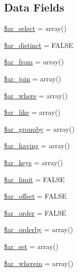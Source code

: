 \subsection*{Data Fields}
\begin{DoxyCompactItemize}
\item 
\hyperlink{class_c_i___d_b__active__record_a6e20fdd21772a1afe552931b7e8226b7}{\$ar\-\_\-select} = array()
\item 
\hyperlink{class_c_i___d_b__active__record_a095d86bc9e6d06232acfa6d43a245fc0}{\$ar\-\_\-distinct} = F\-A\-L\-S\-E
\item 
\hyperlink{class_c_i___d_b__active__record_a862adab461db1d5e818cea446648220c}{\$ar\-\_\-from} = array()
\item 
\hyperlink{class_c_i___d_b__active__record_a7586606381cc112cad3f31aabbc31ea6}{\$ar\-\_\-join} = array()
\item 
\hyperlink{class_c_i___d_b__active__record_acc294995d7d46cfa1c5e4377b1a691ec}{\$ar\-\_\-where} = array()
\item 
\hyperlink{class_c_i___d_b__active__record_a932080b6d718eb255adee55d0a05f815}{\$ar\-\_\-like} = array()
\item 
\hyperlink{class_c_i___d_b__active__record_a708d484566c200d28d8e3139cc6a8a6c}{\$ar\-\_\-groupby} = array()
\item 
\hyperlink{class_c_i___d_b__active__record_a7d7dbdaa94e66d6e18088da8c614644d}{\$ar\-\_\-having} = array()
\item 
\hyperlink{class_c_i___d_b__active__record_aebf004d80ee72abc06da59389da36c45}{\$ar\-\_\-keys} = array()
\item 
\hyperlink{class_c_i___d_b__active__record_afd3444376e2806c184aec39da01adad5}{\$ar\-\_\-limit} = F\-A\-L\-S\-E
\item 
\hyperlink{class_c_i___d_b__active__record_a0b62c5aa489250b693f22a50ea6b2094}{\$ar\-\_\-offset} = F\-A\-L\-S\-E
\item 
\hyperlink{class_c_i___d_b__active__record_a3aac663f32333aebe197788ecb20a469}{\$ar\-\_\-order} = F\-A\-L\-S\-E
\item 
\hyperlink{class_c_i___d_b__active__record_a3880e9552e8633df582665611281d5ee}{\$ar\-\_\-orderby} = array()
\item 
\hyperlink{class_c_i___d_b__active__record_a689f677e0352b03a1a51f9b3ef30a663}{\$ar\-\_\-set} = array()
\item 
\hyperlink{class_c_i___d_b__active__record_ad2c99824b4b9114fd06caf4627dcd7a7}{\$ar\-\_\-wherein} = array()
\item 

\end{DoxyCompactItemize}
